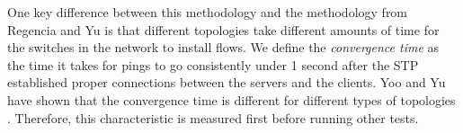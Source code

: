 One key difference between this methodology and the methodology from Regencia and Yu is that different topologies take different amounts of time for the switches in the network to install flows. We define the \textit{convergence time} as the time it takes for pings to go consistently under 1 second after the STP established proper connections between the servers and the clients. Yoo and Yu have shown that the convergence time is different for different types of topologies \cite{yoo_building_2022}. Therefore, this characteristic is measured first before running other tests.

